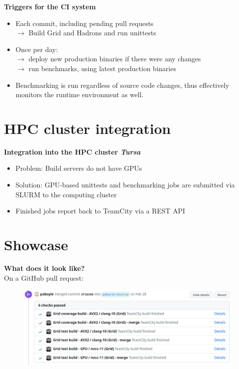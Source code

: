 \documentclass[english,xcolor=pst,11pt]{beamer}
\begin{document}
\begin{frame}
 \textbf{Triggers for the CI system}
\begin{itemize}
 \item Each commit, including pending pull requests \\$\longrightarrow$ Build Grid and Hadrons and run unittests
 \item Once per day: \\$\longrightarrow$ deploy new production binaries if there were any changes \\
 $\longrightarrow$ run benchmarks, using latest production binaries
 \item Benchmarking is run regardless of source code changes, thus effectively monitors the runtime environment as well.
\end{itemize}
\end{frame}

\section{HPC cluster integration}
\begin{frame}
 \textbf{Integration into the HPC cluster \emph{Tursa}}
 \begin{itemize}
  \item Problem: Build servers do not have GPUs
  \item Solution: GPU-based unittests and benchmarking jobs are submitted via SLURM to the computing cluster
  \item Finished jobs report back to TeamCity via a REST API
 \end{itemize}

\end{frame}

\section{Showcase}
\begin{frame}
 \textbf{What does it look like?}\\
 On a GitHub pull request:
  \begin{figure}[H]
	\centering
    {\includegraphics[width=4.5in]{diagrams/pr.jpg}}
\end{figure}
\end{frame}
\end{document}
